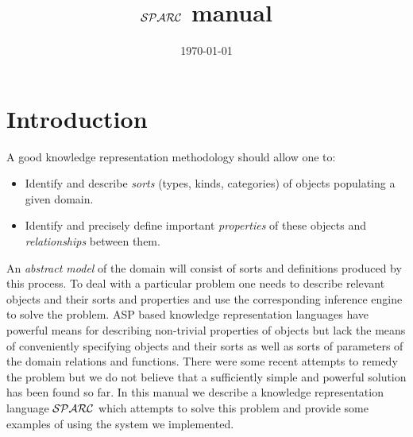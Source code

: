\documentclass[12pt, letterpaper]{article}
\begin{document}
\newcommand{\hide}[1]{}
\newcommand{\exercise}[1]{}
\newcommand{\future}[1]{}
\newcommand{\otherquestions}[1]{}
\newcommand{\set}[1]{\{#1\}}
\newcommand{\pg}[1]{{\tt #1}}
\newtheorem{definition}{Definition}
\newcommand{\emptyclause}{\Box}
\def\st{\bigskip\noindent}
\newcommand{\lplus}
{
   \stackrel{+}{\gets}
}

\newcommand{\fe}[1] {
  \begin{frame}
    #1
  \end{frame}}

\newcommand{\eoa}{ {\bf End} of algorithm}

\newcommand{\ft}[1] {\frametitle{#1}}

\newcommand{\ie}[1] {
  \begin{itemize}
    #1
  \end{itemize}
}

\newcommand{\ee}[1] {
  \begin{enumerate}
    #1
  \end{enumerate}\label{marker}
}
\newcommand{\blk}[2] {
  \begin{block}{#1}
    #2
  \end{block}
}

\newtheorem{collorary}{Corollary}
\newtheorem{proposition}{Proposition}
\newtheorem{invariant}{Invariant}
\newtheorem{property}{Property}
\newtheorem{claim}{Claim}
\newtheorem{example}{Example}


\title{${\cal SPARC}$ manual}
\date{\today}
\maketitle
\tableofcontents
\pagebreak
\section{Introduction}
A good knowledge representation methodology should allow one to:
\begin{itemize}
\item Identify and describe \emph{sorts} (types, kinds,
categories) of objects
populating a given domain.
\item Identify and precisely
define important \emph{properties} of these objects and
\emph{relationships} between them.
\end{itemize}
An \emph{abstract model} of the
domain will consist of sorts
and definitions produced by this process.
To deal with a particular problem one needs to
describe relevant objects and their sorts
and properties and use
the corresponding inference engine to solve the problem.
ASP based knowledge representation languages have powerful
means for describing non-trivial properties of objects
but lack the means of conveniently specifying objects
and their sorts as well as sorts of parameters
of the domain relations and functions. There were some
recent attempts to remedy the problem but we do not believe
that a sufficiently simple and powerful solution has been
found so far. In this manual we describe a knowledge representation
language ${\cal SPARC}$ which attempts to solve this problem and provide some examples of using the system we implemented.
\end{document}
